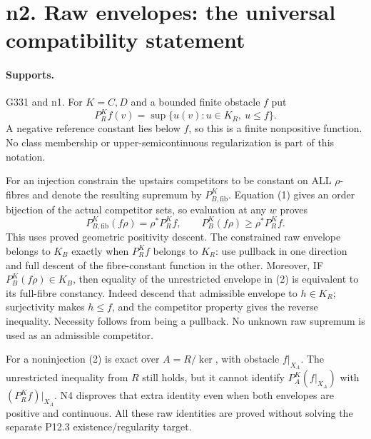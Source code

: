 \section{n2. Raw envelopes: the universal compatibility statement}
\paragraph{Supports.} G331 and n1.
For $K=C,D$ and a bounded finite obstacle $f$ put
\[
 P_R^Kf(v)=\sup\{u(v):u\in K_R,\ u\le f\}.
\]
A negative reference constant lies below $f$, so this is a finite nonpositive function. No class membership or upper-semicontinuous regularization is part of this notation.

For an injection constrain the upstairs competitors to be constant on ALL $\rho$-fibres and denote the resulting supremum by $P_{B,\mathrm{fib}}^K$. Equation (1) gives an order bijection of the actual competitor sets, so evaluation at any $w$ proves
\[
 P_{B,\mathrm{fib}}^K(f\rho)=\rho^*P_R^Kf,\qquad
 P_B^K(f\rho)\ge\rho^*P_R^Kf. \tag{2}
\]
This uses proved geometric positivity descent. The constrained raw envelope belongs to $K_B$ exactly when $P_R^Kf$ belongs to $K_R$: use pullback in one direction and full descent of the fibre-constant function in the other. Moreover, IF $P_B^K(f\rho)\in K_B$, then equality of the unrestricted envelope in (2) is equivalent to its full-fibre constancy. Indeed descend that admissible envelope to $h\in K_R$; surjectivity makes $h\le f$, and the competitor property gives the reverse inequality. Necessity follows from being a pullback. No unknown raw supremum is used as an admissible competitor.

For a noninjection (2) is exact over $A=R/\ker$, with obstacle $f|_{X_A}$. The unrestricted inequality from $R$ still holds, but it cannot identify $P_A^K(f|_{X_A})$ with $(P_R^Kf)|_{X_A}$. N4 disproves that extra identity even when both envelopes are positive and continuous. All these raw identities are proved without solving the separate P12.3 existence/regularity target.
